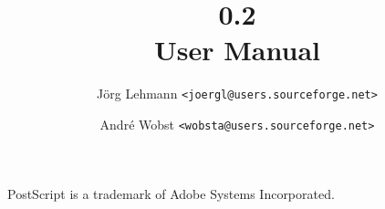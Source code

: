 \documentclass{scrreprt}
\begin{document}
\subject{\texttt{http://pyx.sourceforge.net/}}
\title{\PyX{} 0.2\\User Manual}
\author{J\"org Lehmann \texttt{<joergl@users.sourceforge.net>}\and
Andr\'e Wobst \texttt{<wobsta@users.sourceforge.net>}}
\maketitle
\quad\vfill\centerline{PostScript is a trademark of Adobe Systems Incorporated.}
\tableofcontents



 






\appendix




\end{document}
